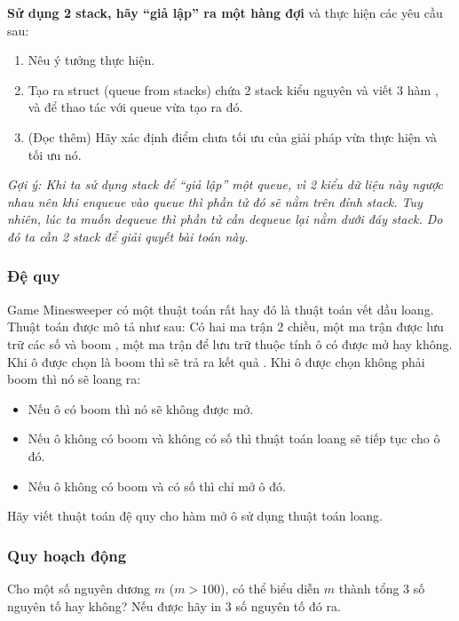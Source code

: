 \documentclass[main.tex]{subfiles}
\begin{document}
\textbf{Sử dụng 2 stack, hãy ``giả lập'' ra một hàng đợi} và thực hiện các yêu cầu sau:
\begin{enumerate}[label=\alph*.]
    \item Nêu ý tưởng thực hiện.
    \item Tạo ra struct  (queue from stacks) chứa 2 stack kiểu nguyên và viết 3 hàm ,  và   để thao tác với queue vừa tạo ra đó.
    \item (Đọc thêm) Hãy xác định điểm chưa tối ưu của giải pháp vừa thực hiện và tối ưu nó.
\end{enumerate}
\textit{Gợi ý: Khi ta sử dụng stack để ``giả lập'' một queue, vì 2 kiểu dữ liệu này ngược nhau nên khi enqueue vào queue thì phần tử đó sẽ nằm trên đỉnh stack. Tuy nhiên, lúc ta muốn dequeue thì phần tử cần dequeue lại nằm dưới đáy stack. Do đó ta cần 2 stack để giải quyết bài toán này.}

\subsubsection{Đệ quy}
Game Minesweeper có một thuật toán rất hay đó là thuật toán vết dầu loang. Thuật toán được mô tả như sau:
Có hai ma trận 2 chiều, một ma trận  được lưu trữ các số và boom , một ma trận  để lưu trữ thuộc tính ô có được mở hay không.
Khi ô được chọn là boom thì sẽ trả ra kết quả .   
Khi ô được chọn không phải boom thì nó sẽ loang ra:  
\begin{itemize}
    \item Nếu ô có boom thì nó sẽ không được mở.
    \item Nếu ô không có boom và không có số thì thuật   toán loang sẽ tiếp tục cho ô đó.
    \item Nếu ô không có boom và có số thì chỉ mở ô đó.
\end{itemize}
Hãy viết thuật toán đệ quy cho hàm mở ô sử dụng thuật toán loang.

\subsubsection{Quy hoạch động}
Cho một số nguyên dương $m$ ($m>100$), có thể biểu diễn $m$ thành tổng 3 số nguyên tố hay không? Nếu được hãy in 3 số nguyên tố đó ra. 
\end{document}
